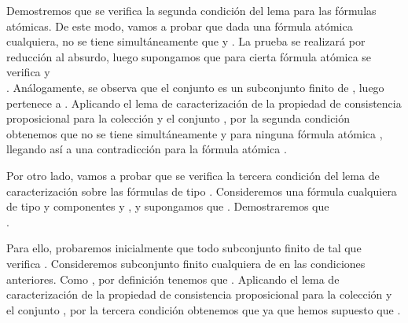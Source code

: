 \begin{isabellebody}
\begin{isamarkuptext}
\begin{demostracion}
  Demostremos que se verifica la segunda condición del lema para las fórmulas atómicas. De este
  modo, vamos a probar que dada  una fórmula atómica cualquiera, no se tiene simultáneamente que
   y . La prueba se realizará por reducción al absurdo, luego supongamos que para
  cierta fórmula atómica se verifica  y\\ . Análogamente, se observa que el conjunto
   es un subconjunto finito de , luego pertenece a . Aplicando el lema de
  caracterización de la propiedad de consistencia proposicional para la colección  y el conjunto
  , por la segunda condición obtenemos que no se tiene simultáneamente  y
   para ninguna fórmula atómica , llegando así a una contradicción para la
  fórmula atómica .

  Por otro lado, vamos a probar que se verifica la tercera condición del lema de\\ caracterización
  sobre las fórmulas de tipo \isa{{\isasymalpha}}. Consideremos una fórmula cualquiera  de tipo \isa{{\isasymalpha}} y componentes 
   y , y supongamos que . Demostraremos que\\ . 

  Para ello, probaremos inicialmente que todo subconjunto finito  de  tal que\\  
  verifica . Consideremos  subconjunto finito cualquiera de  en las
  condiciones anteriores. Como , por definición tenemos que . Aplicando el lema de 
  caracterización de la propiedad de consistencia proposicional para la colección  y el conjunto
  , por la tercera condición obtenemos que  ya que hemos supuesto que 
  .


\end{demostracion}
\end{isamarkuptext}
\end{isabellebody}
